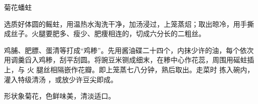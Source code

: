 \begin{recipe}{菊花蟠蛀}

\ingredients


\cooking

\step 选质好体圆的鳐蛀，用温热水淘洗干净，加汤浸过，上笼蒸炤；取出晾冷，用手撕
成丝子。火腿要肥多、瘦少、肥痩相连的，切成六分长的二粗丝。

\step 鸡脯、肥膘、蛋清等打成“鸡糁”。先用酱油碟二十四个，内抹少许的油，每个依次
用调羹舀入鸡糁，刮平刮圆。将豌豆米铡成细末，在糁中心作花蕊，周围用磘蛀插上，与
火 腿丝相隔嵌作花瓣。即上笼蒸七八分钟，熟后取出。走菜时 拣入碗内，灌入特级清汤
，或放少许豆尖即成。

\notes

形状象菊花，色鲜味美，清淡适口。

\end{recipe}

